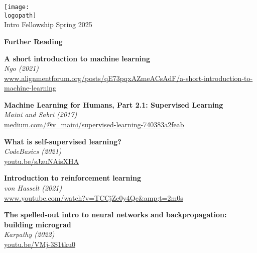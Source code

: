 \documentclass[12pt]{article}
\def\logopath{../assets/caiac_logo.png}  %
\def\programlongname{
    Intro Fellowship
}
\def\timeperiod{
    Spring 2025
}
\begin{document}
\thispagestyle{empty} %

\begin{center}
    \texttt{[image: \\logopath]}\\
    \vspace{0.2em}
    {\color{primaryFaded}\programlongname\color{primaryFaded}\timeperiod}
\end{center}

\vspace{1em}

\begin{center}
    {\LARGE \textbf{Further Reading}}
\end{center}

\vspace{1em}

% 
\noindent\textbf{ A short introduction to machine learning }\\
\textit{ Ngo (2021) }\\
{\small \url{ www.alignmentforum.org/posts/qE73pqxAZmeACsAdF/a-short-introduction-to-machine-learning }}

\vspace{1em}
% 
\noindent\textbf{ Machine Learning for Humans, Part 2.1: Supervised Learning }\\
\textit{ Maini and Sabri (2017) }\\
{\small \url{ medium.com/@v_maini/supervised-learning-740383a2feab }}

\vspace{1em}
% 
\noindent\textbf{ What is self-supervised learning? }\\
\textit{ CodeBasics (2021) }\\
{\small \url{ youtu.be/sJzuNAisXHA }}

\vspace{1em}
% 
\noindent\textbf{ Introduction to reinforcement learning }\\
\textit{ von Hasselt (2021) }\\
{\small \url{ www.youtube.com/watch?v=TCCjZe0y4Qc&amp;t=2m0s }}

\vspace{1em}
% 
\noindent\textbf{ The spelled-out intro to neural networks and backpropagation: building micrograd }\\
\textit{ Karpathy (2022) }\\
{\small \url{ youtu.be/VMj-3S1tku0 }}
\end{document}
